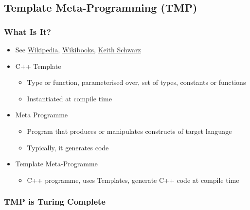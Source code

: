 \subsection{Template Meta-Programming
(TMP)}\label{template-meta-programming-tmp}

\subsubsection{What Is It?}\label{what-is-it-1}

\begin{itemize}
\itemsep1pt\parskip0pt
\item
  See
  \href{http://en.wikipedia.org/wiki/Template_metaprogramming}{Wikipedia},
  \href{http://en.wikibooks.org/wiki/C\%2B\%2B_Programming/Templates/Template_Meta-Programming}{Wikibooks},
  \href{http://www.keithschwarz.com/talks/slides/tmp-cs242.pdf}{Keith
  Schwarz}
\item
  C++ Template

  \begin{itemize}
  \itemsep1pt\parskip0pt
  \item
    Type or function, parameterised over, set of types, constants or
    functions
  \item
    Instantiated at compile time
  \end{itemize}
\item
  Meta Programme

  \begin{itemize}
  \itemsep1pt\parskip0pt
  \item
    Program that produces or manipulates constructs of target language
  \item
    Typically, it generates code
  \end{itemize}
\item
  Template Meta-Programme

  \begin{itemize}
  \itemsep1pt\parskip0pt
  \item
    C++ programme, uses Templates, generate C++ code at compile time
  \end{itemize}
\end{itemize}

\subsubsection{TMP is Turing Complete}\label{tmp-is-turing-complete}

